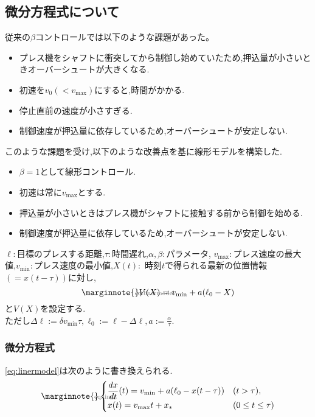 \documentclass[leqno,11pt]{jarticle}
\makeatletter
\let\temp@label\label
\def\label#1{\marginnote{\hbox to 0pt{\scriptsize \textcolor{black!60}{#1}\hss}}\temp@label{#1}\ignorespaces}
\numberwithin{equation}{section}
\theoremstyle{definition} %
\theoremstyle{definition} %
\makeatother
\begin{document}
\subsection{微分方程式について}
従来の$\beta$コントロールでは以下のような課題があった。
\begin{itemize}
    \item プレス機をシャフトに衝突してから制御し始めていたため,押込量が小さいときオーバーシュートが大きくなる.
    \item 初速を$v_0(<v_{\max})$にすると,時間がかかる.
    \item 停止直前の速度が小さすぎる.
    \item 制御速度が押込量に依存しているため,オーバーシュートが安定しない.
\end{itemize}
このような課題を受け,以下のような改善点を基に線形モデルを構築した.
\begin{itemize}
    \item $\beta=1$として線形コントロール. 
    \item 初速は常に$v_{\max}$とする.
    \item 押込量が小さいときはプレス機がシャフトに接触する前から制御を始める.
    \item 制御速度が押込量に依存しているため,オーバーシュートが安定しない.
\end{itemize}
$\ell:$目標のプレスする距離,$\tau:$時間遅れ,$\alpha,\beta:$パラメータ,
$v_{\max}:$プレス速度の最大値,$v_{\min}:$プレス速度の最小値,$X(t):$
時刻$t$で得られる最新の位置情報$(=x(t-\tau))$に対し,
\begin{equation}\label{eq:linermodel}
    V(X)=v_{\min}+a(\ell_0-X)
\end{equation}
と$V(X)$を設定する.\\ただし$\Delta\ell :=\delta v_{\min}\tau,
\ell_0:=\ell-\Delta\ell,a:=\frac{\alpha}{\tau}.$
\subsubsection{微分方程式}
\eqref{eq:linermodel}は次のように書き換えられる.
\begin{equation}\label{eq:liner}\begin{cases}
    \displaystyle\frac{dx}{dt}(t)=v_{\min}+a(\ell_0-x(t-\tau)) &(t>\tau),\\
    x(t)=v_{\max}t+x_\ast &(0\le t \le \tau)
\end{cases}\end{equation}
\end{document}
